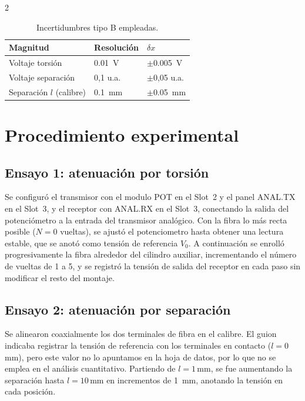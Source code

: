 \documentclass[12pt,a4paper]{article}
\begin{document}
\begin{multicols}{2}
\begin{table}[H]
\centering
\caption{Incertidumbres tipo B empleadas.}
\label{tab:incertidumbres}
\small
\begin{tabular}{p{}p{}p{}}
\toprule
Magnitud & Resolución & $\delta x$ \\
\midrule
Voltaje torsión & \SI{0.01}{V} & $\pm$\SI{0.005}{V} \\
Voltaje separación & 0{,}1 u.a. & $\pm$0{,}05 u.a. \\
Separación $l$ (calibre) & \SI{0.1}{mm} & $\pm$\SI{0.05}{mm} \\
\bottomrule
\end{tabular}
\end{table}

\section{Procedimiento experimental}

\subsection{Ensayo 1: atenuación por torsión}

Se configuró el transmisor con el modulo POT en el Slot~2 y el panel ANAL.TX en el Slot~3, y el receptor con ANAL.RX en el Slot~3, conectando la salida del potenciómetro a la entrada del transmisor analógico. Con la fibra lo más recta posible ($N=0$ vueltas), se ajustó el potenciometro hasta obtener una lectura estable, que se anotó como tensión de referencia $V_0$. A continuación se enrolló progresivamente la fibra alrededor del cilindro auxiliar, incrementando el número de vueltas de 1 a 5, y se registró la tensión de salida del receptor en cada paso sin modificar el resto del montaje.

\subsection{Ensayo 2: atenuación por separación}

Se alinearon coaxialmente los dos terminales de fibra en el calibre. El guion indicaba registrar la tensión de referencia con los terminales en contacto ($l=0$\,mm), pero este valor no lo apuntamos en la hoja de datos, por lo que no se emplea en el análisis cuantitativo. Partiendo de $l=1$\,mm, se fue aumentando la separación hasta $l=10$\,mm en incrementos de \SI{1}{mm}, anotando la tensión en cada posición.


\end{multicols}
\end{document}
